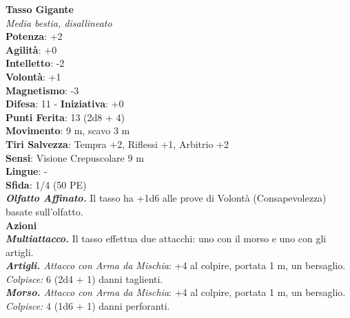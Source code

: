\begin{multicols}{2}
\medskip\textbf{Tasso Gigante}\\
\emph{Media bestia, disallineato}\\
\textbf{Potenza}: +2\\
\textbf{Agilità}: +0\\
\textbf{Intelletto}: -2\\
\textbf{Volontà}: +1\\
\textbf{Magnetismo}: -3\\
\textbf{Difesa}: 11 - \textbf{Iniziativa}: +0\\
\textbf{Punti Ferita}: 13 (2d8 + 4)\\
\textbf{Movimento}: 9 m, scavo 3 m\\
\textbf{Tiri Salvezza}: Tempra +2, Riflessi +1, Arbitrio +2\\
\textbf{Sensi}: Visione Crepuscolare 9 m \\
\textbf{Lingue}: -\\
\textbf{Sfida}: 1/4 (50 PE)\smallskip\\
\emph{\textbf{Olfatto Affinato.}} Il tasso ha +1d6 alle prove di Volontà (Consapevolezza) basate sull'olfatto.\\
\smallskip\textbf{Azioni}\\
\emph{\textbf{Multiattacco.}} Il tasso effettua due attacchi: uno con il morso e uno con gli artigli.\\
\emph{\textbf{Artigli.} Attacco con Arma da Mischia}: +4 al colpire, portata 1 m, un bersaglio.\\
\emph{Colpisce:} 6 (2d4 + 1) danni taglienti.\\
\emph{\textbf{Morso.} Attacco con Arma da Mischia}: +4 al colpire, portata 1 m, un bersaglio.\\
\emph{Colpisce:} 4 (1d6 + 1) danni perforanti.\\


\end{multicols}
